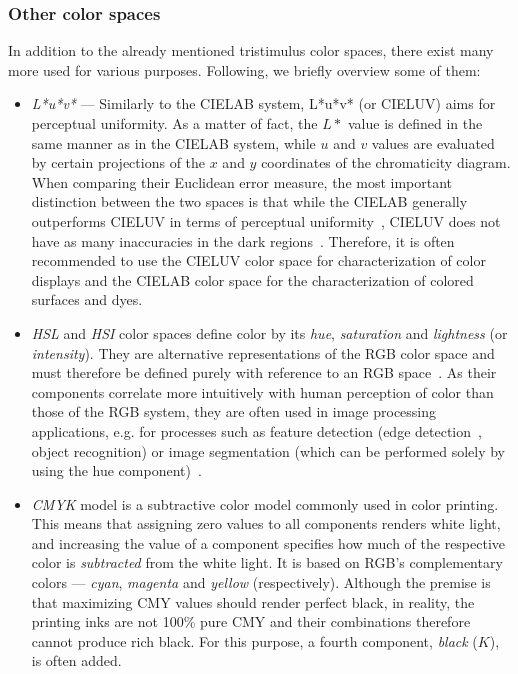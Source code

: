 \subsubsection{Other color spaces}

In addition to the already mentioned tristimulus color spaces, there exist many more used for various purposes. Following, we briefly overview some of them:
\begin{itemize}
\item \emph{L*u*v*} --- Similarly to the CIELAB system, L*u*v* (or CIELUV) aims for perceptual uniformity. As a matter of fact, the $L*$ value is defined in the same manner as in the CIELAB system, while $u$ and $v$ values are evaluated by certain projections of the $x$ and $y$ coordinates of the chromaticity diagram. When comparing their Euclidean error measure, the most important distinction between the two spaces is that while the CIELAB generally outperforms CIELUV in terms of perceptual uniformity~\cite{CIELABcomparisonCIELUV}, CIELUV does not have as many inaccuracies in the dark regions~\cite{CIELABDarkSide}. Therefore, it is often recommended to use the CIELUV color space for characterization of color displays and the CIELAB color space for the characterization of colored surfaces and dyes.

\item \emph{HSL} and \emph{HSI} color spaces define color by its \emph{hue}, \emph{saturation} and \emph{lightness} (or \emph{intensity}). They are alternative representations of the RGB color space and must therefore be defined purely with reference to an RGB space~\cite{HSLreview}. As their components correlate more intuitively with human perception of color than those of the RGB system, they are often used in image processing applications, e.g. for processes such as feature detection (edge detection~\cite{edgeDetectionHSL}, object recognition) or image segmentation (which can be performed solely by using the hue component)~\cite{HSLreview}.

\item \emph{CMYK} model is a subtractive color model commonly used in color printing. This means that assigning zero values to all components renders white light, and increasing the value of a component specifies how much of the respective color is \emph{subtracted} from the white light. It is based on RGB's complementary colors --- \emph{cyan}, \emph{magenta} and \emph{yellow} (respectively). Although the premise is that maximizing CMY values should render perfect black, in reality, the printing inks are not 100\% pure CMY and their combinations therefore cannot produce rich black. For this purpose, a fourth component, \emph{black} ($K$), is often added.
\end{itemize}

